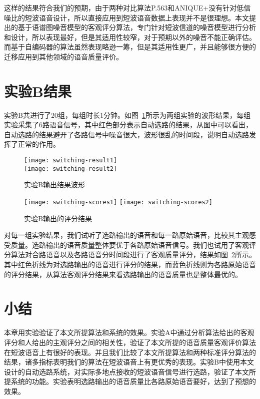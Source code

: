 这样的结果符合我们的预期，由于两种对比算法P.563和ANIQUE+没有针对低信噪比的短波语音设计，所以直接应用到短波语音数据上表现并不是很理想。本文提出的基于语谱图噪音模型的客观评分算法，专门针对短波信道的噪音模型进行分析和设计，所以表现最好，但是其适用性较窄，对于预期以外的噪音不能正确评估。而基于自编码器的算法虽然表现略逊一筹，但是其适用性更广，并且能够很方便的迁移应用到其他领域的语音质量评价。

\section{实验B结果}

实验B共进行了20组，每组时长1分钟。如图~\ref{fig:switching-result}所示为两组实验的波形结果，每组实验采集了6路语音信号，其中红色部分表示自动选路的结果，从图中可以看出，自动选路的结果避开了各路信号中噪音很大，波形很乱的时间段，说明自动选路发挥了正常的作用。

\begin{figure}
\centering
{} {
    \texttt{[image: switching-result1]}
}
\vspace{1.2ex}
\\
 {
    \texttt{[image: switching-result2]}
}
\vspace{0.8ex}
\\
\caption{实验B输出结果波形\label{fig:switching-result}}
\end{figure}

\begin{figure}
\centering
\texttt{[image: switching-scores1]}
\texttt{[image: switching-scores2]}
\caption{实验B输出的评分结果\label{fig:switching-scores}}
\end{figure}

对每一组实验结果，我们试听了选路输出的语音和每一路原始语音，比较其主观感受质量。选路输出的语音质量整体要优于各路原始语音信号。我们也试用了客观评分算法对合路语音以及各路语音分时间段进行了客观质量评分，结果如图~\ref{fig:switching-scores}所示。其中红色折线为对选路输出的语音进行评分的结果，而蓝色折线则为各路原始语音的评分结果，从算法客观评分结果来看选路输出的语音质量也是整体最优的。

\section{小结}

本章用实验验证了本文所提算法和系统的效果。实验A中通过分析算法给出的客观评分和人给出的主观评分之间的相关性，验证了本文所提的语音质量客观评价算法在短波语音上有很好的表现。并且我们比较了本文所提算法和两种标准评分算法的结果，诸多指标表明我们的算法在短波语音上有更优秀的表现。实验B中使用本文设计的自动选路系统，对实际多地点接收的短波语音信号进行选路，验证了本文所提系统的功能。实验表明选路输出的语音质量比各路原始语音要好，达到了预想的效果。